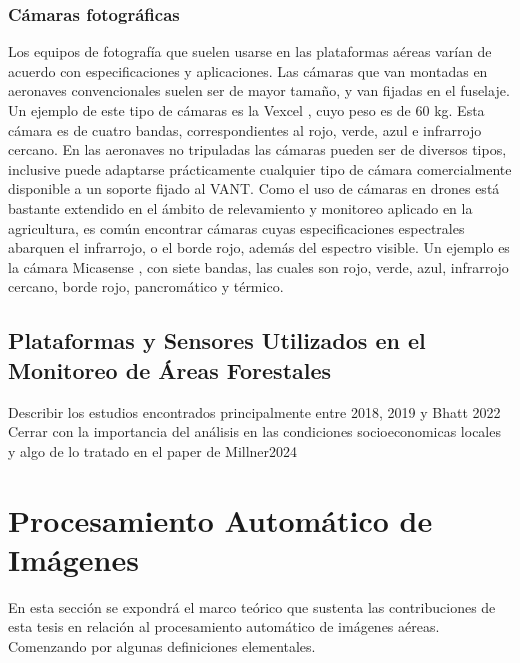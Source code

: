 \subsubsection{Cámaras fotográficas}
Los equipos de fotografía que suelen usarse en las plataformas aéreas varían de acuerdo con especificaciones y aplicaciones. Las cámaras que van montadas en aeronaves convencionales suelen ser de mayor tamaño, y van fijadas en el fuselaje. Un ejemplo de este tipo de cámaras es la Vexcel \cite{noauthor_ultracam_nodate}, cuyo peso es de 60 kg. Esta cámara es de cuatro bandas, correspondientes al rojo, verde, azul e infrarrojo cercano. En las aeronaves no tripuladas las cámaras pueden ser de diversos tipos, inclusive puede adaptarse prácticamente cualquier tipo de cámara comercialmente disponible a un soporte fijado al VANT. Como el uso de cámaras en drones está bastante extendido en el ámbito de relevamiento y monitoreo aplicado en la agricultura, es común encontrar cámaras cuyas especificaciones espectrales abarquen el infrarrojo, o el borde rojo, además del espectro visible. Un ejemplo es la cámara Micasense \cite{noauthor_altum-pt_2023}, con siete bandas, las cuales son rojo, verde, azul, infrarrojo cercano, borde rojo, pancromático y térmico.
 
\subsection{Plataformas y Sensores Utilizados en el Monitoreo de Áreas Forestales}

Describir los estudios encontrados principalmente entre 2018, 2019 y Bhatt 2022 
Cerrar con la importancia del análisis en las condiciones socioeconomicas locales y algo de lo tratado en el paper de Millner2024

\section{Procesamiento Automático de Imágenes}

En esta sección se expondrá el marco teórico que sustenta las contribuciones de esta tesis en relación al procesamiento automático de imágenes aéreas. Comenzando por algunas definiciones elementales.

